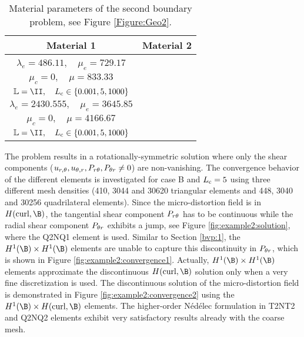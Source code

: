 \begin{table}[ht]
\center
\begin{tabular}{|c|c|}
\hline
Material 1 & Material 2 \\
\hline
\begin{minipage}[t]{7cm}
	$ \lambda_\textrm{micro} = 555.55 , \quad \mu_\textrm{micro} = 833.33$ \\ $\lambda_e = 486.11, \quad \mu_e = 729.17$\\
	$\mu_c = 0, \quad \mu=833.33$ \\ 
	$\IL = \II, \quad \Lc \in \{0.001, 5, 1000\}$ 
\end{minipage} & 
\begin{minipage}[t]{7cm}
	$ \lambda_\textrm{micro} = 2777.78 , \quad \mu_\textrm{micro} = 4166.67$ \\ $\lambda_e = 2430.555, \quad \mu_e = 3645.85$\\
	$\mu_c = 0, \quad \mu=4166.67$ \\
	 $\IL = \II, \quad \Lc \in \{0.001, 5, 1000\}$ 
\end{minipage} \\
\hline
\end{tabular}
\caption{Material parameters of the second boundary problem, see Figure \ref{Figure:Geo2}.}
\label{tab:example2:MP}
\end{table}

The problem results in a rotationally-symmetric solution where only the shear components ($u_{r,\theta}, u_{\theta,r}, P_{r \theta}, P_{\theta r} \neq 0$)  are non-vanishing. The convergence behavior of the different elements is investigated for case B and $L_{\mathrm{c}} = 5$ using three different mesh densities
(410, 3044 and 30620 triangular elements and 448, 3040 and 30256 quadrilateral elements).  Since the micro-distortion field is in $H(\curl,\B)$, the tangential shear component $P_{r \theta}$ has to be continuous while the radial shear component $P_{\theta r}$ exhibits a jump, see Figure \ref{fig:example2:solution}, where the Q2NQ1 element is used. Similar to Section \ref{bvp:1}, the $H^1(\B) \times H^1(\B)$ elements are unable to capture this discontinuity in $P_{\theta r}$, which is shown in Figure \ref{fig:example2:convergence1}. 
 Actually, $H^1(\B) \times H^1(\B)$ elements approximate the discontinuous  $H(\curl,\B)$ solution only when a very fine discretization is used. The discontinuous solution of the micro-distortion field is demonstrated in Figure  \ref{fig:example2:convergence2}  using the  $H^1(\B) \times H(\curl,\B)$ elements. The higher-order N\'ed\'elec formulation in T2NT2 and Q2NQ2 elements exhibit very satisfactory results already with the coarse mesh. 


